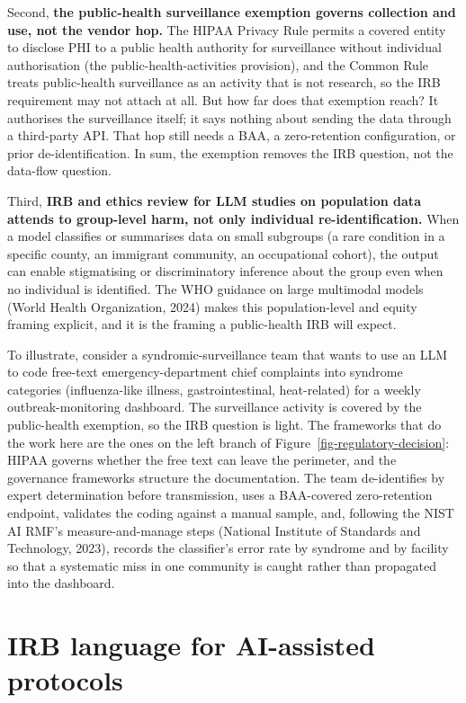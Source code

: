 \documentclass[
  letterpaper,
  11pt]{scrbook}
\begin{document}
Second, \textbf{the public-health surveillance exemption governs
collection and use, not the vendor hop.} The HIPAA Privacy Rule permits
a covered entity to disclose PHI to a public health authority for
surveillance without individual authorisation (the
public-health-activities provision), and the Common Rule treats
public-health surveillance as an activity that is not research, so the
IRB requirement may not attach at all. But how far does that exemption
reach? It authorises the surveillance itself; it says nothing about
sending the data through a third-party API. That hop still needs a BAA,
a zero-retention configuration, or prior de-identification. In sum, the
exemption removes the IRB question, not the data-flow question.

Third, \textbf{IRB and ethics review for LLM studies on population data
attends to group-level harm, not only individual re-identification.}
When a model classifies or summarises data on small subgroups (a rare
condition in a specific county, an immigrant community, an occupational
cohort), the output can enable stigmatising or discriminatory inference
about the group even when no individual is identified. The WHO guidance
on large multimodal models (World Health Organization, 2024) makes this
population-level and equity framing explicit, and it is the framing a
public-health IRB will expect.

To illustrate, consider a syndromic-surveillance team that wants to use
an LLM to code free-text emergency-department chief complaints into
syndrome categories (influenza-like illness, gastrointestinal,
heat-related) for a weekly outbreak-monitoring dashboard. The
surveillance activity is covered by the public-health exemption, so the
IRB question is light. The frameworks that do the work here are the ones
on the left branch of Figure~\ref{fig-regulatory-decision}: HIPAA
governs whether the free text can leave the perimeter, and the
governance frameworks structure the documentation. The team
de-identifies by expert determination before transmission, uses a
BAA-covered zero-retention endpoint, validates the coding against a
manual sample, and, following the NIST AI RMF's measure-and-manage steps
(National Institute of Standards and Technology, 2023), records the
classifier's error rate by syndrome and by facility so that a systematic
miss in one community is caught rather than propagated into the
dashboard.

\section{IRB language for AI-assisted
protocols}\label{irb-language-for-ai-assisted-protocols}
\end{document}
